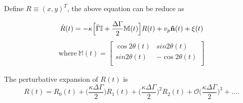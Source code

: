 \documentclass[]{article}
\begin{document}
Define \(R\equiv (x,y)^T\), the above equation can be reduce as

\begin{equation}
 \dot R(t)= -\kappa\Big[\bar\Gamma \mathbb{I}  + \frac{\Delta \Gamma}{2} \mathbb{M}(t)\Big]R(t)+v_p \bold {\hat n}(t)+ \xi(t)
 \end{equation}
\begin{align*}
 \text {where} \ \mathbb{M}(t) =
\begin{bmatrix}
  \cos 2\theta(t) & sin 2\theta(t)\\
  sin 2\theta(t) & -\cos 2\theta(t)\\
 \end{bmatrix}
\end{align*}


 The perturbative expansion of \(R(t)\) is
\begin{equation}\label{}
R(t) =R_0(t)+\bigg(\frac{\kappa \Delta \Gamma}{2}\bigg)R_1(t)+\bigg(\frac{\kappa \Delta \Gamma}{2}\bigg)^2R_2(t)+ \mathcal{O}\bigg(\frac{\kappa \Delta \Gamma}{2}\bigg)^3+....
\end{equation}
\end{document}

